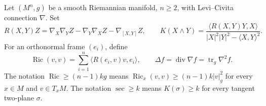 Let \((M^n,g)\) be a smooth Riemannian manifold, \(n\ge2\), with Levi--Civita connection \(\nabla\). Set
\[
R(X,Y)Z=\nabla_X\nabla_YZ-\nabla_Y\nabla_XZ-\nabla_{[X,Y]}Z,
\qquad
K(X\wedge Y)=\frac{\langle R(X,Y)Y,X\rangle}{|X|^2|Y|^2-\langle X,Y\rangle^2}.
\]
For an orthonormal frame \((e_i)\), define
\[
\operatorname{Ric}(v,v)=\sum_{i=1}^n\langle R(e_i,v)v,e_i\rangle,
\qquad \Delta f=\operatorname{div}\nabla f=\operatorname{tr}_g\nabla^2f.
\]
The notation \(\operatorname{Ric}\ge(n-1)k g\) means
\(\operatorname{Ric}_x(v,v)\ge(n-1)k|v|_g^2\) for every \(x\in M\) and \(v\in T_xM\).
The notation \(\sec\ge k\) means \(K(\sigma)\ge k\) for every tangent two-plane \(\sigma\).